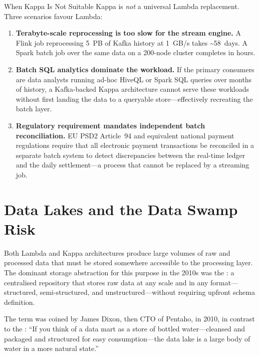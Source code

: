 \begin{caution}{When Kappa Is Not Suitable}
Kappa is \emph{not} a universal Lambda replacement. Three scenarios
favour Lambda:
\begin{enumerate}
  \item \textbf{Terabyte-scale reprocessing is too slow for the stream
        engine.} A Flink job reprocessing 5~PB of Kafka history at
        1~GB/s takes \textasciitilde{}58~days. A Spark batch job over
        the same data on a 200-node cluster completes in hours.
  \item \textbf{Batch SQL analytics dominate the workload.} If the
        primary consumers are data analysts running ad-hoc HiveQL or
        Spark SQL queries over months of history, a Kafka-backed Kappa
        architecture cannot serve these workloads without first landing
        the data to a queryable store---effectively recreating the
        batch layer.
  \item \textbf{Regulatory requirement mandates independent batch
        reconciliation.} EU PSD2 Article~94 and equivalent national
        payment regulations require that all electronic payment
        transactions be reconciled in a separate batch system to detect
        discrepancies between the real-time ledger and the daily
        settlement---a process that cannot be replaced by a streaming job.
\end{enumerate}
\end{caution}

\section{Data Lakes and the Data Swamp Risk}
\label{sec:data-lakes}

Both Lambda and Kappa architectures produce large volumes of raw and
processed data that must be stored somewhere accessible to the processing
layer. The dominant storage abstraction for this purpose in the 2010s
was the : a centralised repository that stores raw data
at any scale and in any format---structured, semi-structured, and
unstructured---without requiring upfront schema definition.

The term was coined by James Dixon, then CTO of Pentaho, in 2010, in
contrast to the : ``If you think of a data mart as a
store of bottled water---cleansed and packaged and structured for easy
consumption---the data lake is a large body of water in a more natural
state.''

